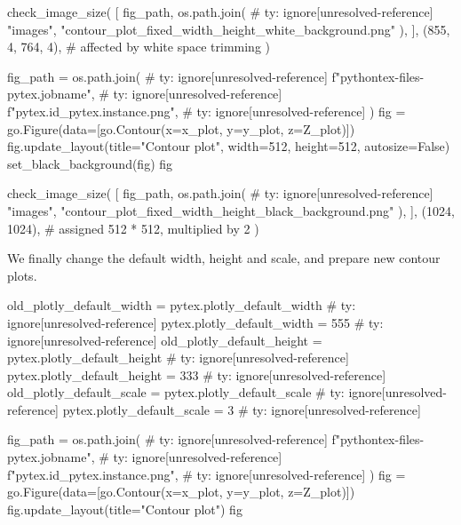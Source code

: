 \documentclass[oneside]{book}
\begin{document}
\begin{pycell}
check_image_size(
    [
        fig_path,
        os.path.join(  # ty: ignore[unresolved-reference]
            "images", "contour_plot_fixed_width_height_white_background.png"
        ),
    ],
    (855, 4, 764, 4),  # affected by white space trimming
)
\end{pycell}

\begin{pycell}
fig_path = os.path.join(  # ty: ignore[unresolved-reference]
    f"pythontex-files-{pytex.jobname}",  # ty: ignore[unresolved-reference]
    f"{pytex.id}_{pytex.instance}.png",  # ty: ignore[unresolved-reference]
)
fig = go.Figure(data=[go.Contour(x=x_plot, y=y_plot, z=Z_plot)])
fig.update_layout(title="Contour plot", width=512, height=512, autosize=False)
set_black_background(fig)
fig
\end{pycell}

\begin{pycell}
check_image_size(
    [
        fig_path,
        os.path.join(  # ty: ignore[unresolved-reference]
            "images", "contour_plot_fixed_width_height_black_background.png"
        ),
    ],
    (1024, 1024),  # assigned 512 * 512, multiplied by 2
)
\end{pycell}

\begin{mdcell}
We finally change the default width, height and scale, and prepare new contour plots.
\end{mdcell}

\begin{pycell}
old_plotly_default_width = pytex.plotly_default_width  # ty: ignore[unresolved-reference]
pytex.plotly_default_width = 555  # ty: ignore[unresolved-reference]
old_plotly_default_height = pytex.plotly_default_height  # ty: ignore[unresolved-reference]
pytex.plotly_default_height = 333  # ty: ignore[unresolved-reference]
old_plotly_default_scale = pytex.plotly_default_scale  # ty: ignore[unresolved-reference]
pytex.plotly_default_scale = 3  # ty: ignore[unresolved-reference]
\end{pycell}

\begin{pycell}
fig_path = os.path.join(  # ty: ignore[unresolved-reference]
    f"pythontex-files-{pytex.jobname}",  # ty: ignore[unresolved-reference]
    f"{pytex.id}_{pytex.instance}.png",  # ty: ignore[unresolved-reference]
)
fig = go.Figure(data=[go.Contour(x=x_plot, y=y_plot, z=Z_plot)])
fig.update_layout(title="Contour plot")
fig
\end{pycell}
\end{document}
